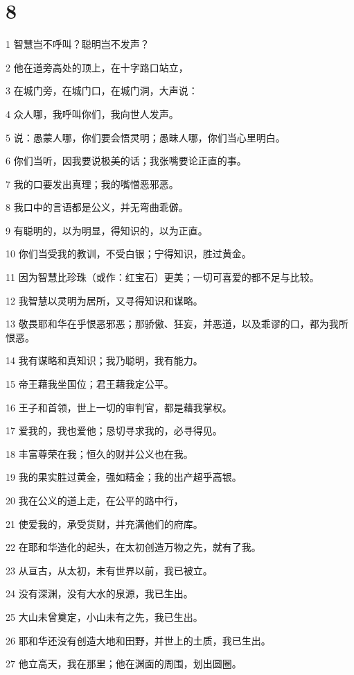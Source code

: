 \chapter{8}

\par 1 智慧岂不呼叫？聪明岂不发声？
\par 2 他在道旁高处的顶上，在十字路口站立，
\par 3 在城门旁，在城门口，在城门洞，大声说：
\par 4 众人哪，我呼叫你们，我向世人发声。
\par 5 说：愚蒙人哪，你们要会悟灵明；愚昧人哪，你们当心里明白。
\par 6 你们当听，因我要说极美的话；我张嘴要论正直的事。
\par 7 我的口要发出真理；我的嘴憎恶邪恶。
\par 8 我口中的言语都是公义，并无弯曲乖僻。
\par 9 有聪明的，以为明显，得知识的，以为正直。
\par 10 你们当受我的教训，不受白银；宁得知识，胜过黄金。
\par 11 因为智慧比珍珠（或作：红宝石）更美；一切可喜爱的都不足与比较。
\par 12 我智慧以灵明为居所，又寻得知识和谋略。
\par 13 敬畏耶和华在乎恨恶邪恶；那骄傲、狂妄，并恶道，以及乖谬的口，都为我所恨恶。
\par 14 我有谋略和真知识；我乃聪明，我有能力。
\par 15 帝王藉我坐国位；君王藉我定公平。
\par 16 王子和首领，世上一切的审判官，都是藉我掌权。
\par 17 爱我的，我也爱他；恳切寻求我的，必寻得见。
\par 18 丰富尊荣在我；恒久的财并公义也在我。
\par 19 我的果实胜过黄金，强如精金；我的出产超乎高银。
\par 20 我在公义的道上走，在公平的路中行，
\par 21 使爱我的，承受货财，并充满他们的府库。
\par 22 在耶和华造化的起头，在太初创造万物之先，就有了我。
\par 23 从亘古，从太初，未有世界以前，我已被立。
\par 24 没有深渊，没有大水的泉源，我已生出。
\par 25 大山未曾奠定，小山未有之先，我已生出。
\par 26 耶和华还没有创造大地和田野，并世上的土质，我已生出。
\par 27 他立高天，我在那里；他在渊面的周围，划出圆圈。
